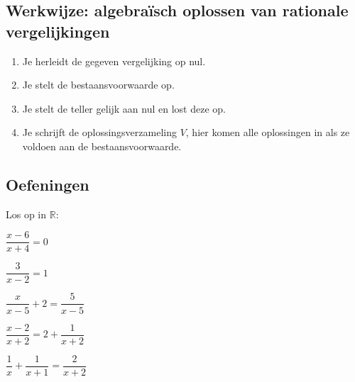 \documentclass[a4paper,12pt]{article}
\begin{document}
\subsection{Werkwijze: algebraïsch oplossen van rationale vergelijkingen}
\begin{enumerate}[(1)]
\item Je herleidt de gegeven vergelijking op nul.
\item Je stelt de bestaansvoorwaarde op.
\item Je stelt de teller gelijk aan nul en lost deze op.
\item Je schrijft de oplossingsverzameling $V$, hier komen alle oplossingen in als ze voldoen aan de bestaansvoorwaarde.
\end{enumerate}

\subsection{Oefeningen}

\begin{oefening} %
Los op in $\mathbb{R}$:
\begin{exlist}{2}
\item $\dfrac{x-6}{x+4}=0$
\item $\dfrac{3}{x-2}=1$
\item $\dfrac{x}{x-5}+2=\dfrac{5}{x-5}$
\item $\dfrac{x-2}{x+2}=2+\dfrac{1}{x+2}$
\item $\dfrac{1}{x}+\dfrac{1}{x+1}=\dfrac{2}{x+2}$
\end{exlist}
\end{oefening}
\end{document}
